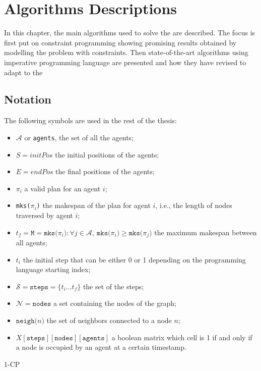\chapter{Algorithms Descriptions}
\label{ch:solutions}
In this chapter, the main algorithms used to solve the  are
described. The focus is first put on constraint programming showing promising
results obtained by modelling the problem with constraints. \newline
Then state-of-the-art algorithms using imperative programming language are
presented and how they have revised to adapt to the 
%
%
%
\newcommand{\mks}[1]{\texttt{mks(}#1\texttt{)}} 
\newcommand{\neigh}[1]{\texttt{neigh(}#1\texttt{)}}
\section{Notation}
The following symbols are used in the rest of the thesis:
\begin{itemize}
  \item $\mathcal{A}$ or \texttt{agents}, the set of all the agents;
  \item $S=initPos$ the initial positions of the agents;
  \item $E=endPos$ the final positions of the agents;
  \item $\pi_i$ a valid plan for an agent $i$;
  \item \mks{$\pi_i$} the makespan of the plan for agent $i$, i.e., the 
    length of nodes traversed by agent $i$;
  \item $t_f= \texttt{M}=\mks{\pi_i} : \forall j \in \mathcal{A},~
    \mks{\pi_i}\geq \mks{\pi_j}$ the maximum makespan between all agents;
  \item $t_i$ the initial step that can be either 0 or 1 depending on the
    programming language starting index;
  \item $\mathcal{S}=\texttt{steps}=\{t_i...t_f\}$ the set of the steps; 
  \item $\mathcal{N}=\texttt{nodes}$ a set containing the nodes of the graph;
  \item $\neigh{n}$ the set of neighbors connected to a node $n$;
  \item $X[\texttt{steps}][\texttt{nodes}][\texttt{agents}]$ a boolean matrix
    which cell is 1 if and only if a node is occupied by an agent at a certain
    timestamp. 
\end{itemize}

%
%
%
{1-CP}
